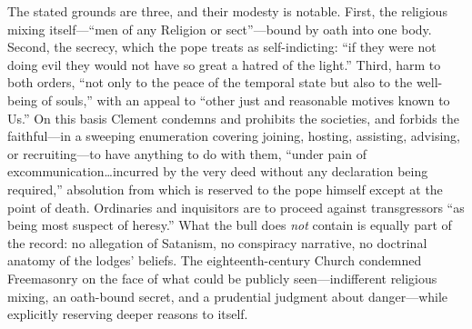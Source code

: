 The stated grounds are three, and their modesty is notable. First, the religious mixing itself---``men of any Religion or sect''---bound by oath into one body. Second, the secrecy, which the pope treats as self-indicting: ``if they were not doing evil they would not have so great a hatred of the light.'' Third, harm to both orders, ``not only to the peace of the temporal state but also to the well-being of souls,'' with an appeal to ``other just and reasonable motives known to Us.'' On this basis Clement condemns and prohibits the societies, and forbids the faithful---in a sweeping enumeration covering joining, hosting, assisting, advising, or recruiting---to have anything to do with them, ``under pain of excommunication\ldots incurred by the very deed without any declaration being required,'' absolution from which is reserved to the pope himself except at the point of death. Ordinaries and inquisitors are to proceed against transgressors ``as being most suspect of heresy.'' What the bull does \emph{not} contain is equally part of the record: no allegation of Satanism, no conspiracy narrative, no doctrinal anatomy of the lodges' beliefs. The eighteenth-century Church condemned Freemasonry on the face of what could be publicly seen---indifferent religious mixing, an oath-bound secret, and a prudential judgment about danger---while explicitly reserving deeper reasons to itself.

